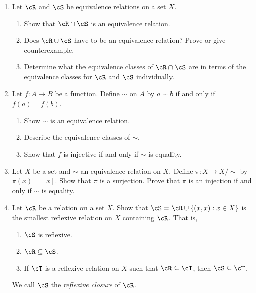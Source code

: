 \begin{enumerate}
  \item Let $\cR$ and $\cS$ be equivalence relations on a set $X$. 
\begin{enumerate}
    \item Show that $\cR \cap \cS$ is an equivalence relation.
    \item Does $\cR \cup \cS$ have to be an equivalence relation? Prove or give counterexample.
    \item Determine what the equivalence classes of $\cR \cap \cS$ are in terms of the equivalence classes for $\cR$ and $\cS$ individually.
\end{enumerate}

\item Let $f : A \to B$ be a function. Define $\sim$ on $A$ by $a \sim b$ if and only if $f(a) = f(b)$. 
\begin{enumerate}
    \item Show $\sim$ is an equivalence relation.
    \item Describe the equivalence classes of $\sim$.
    \item Show that $f$ is injective if and only if $\sim$ is equality.
\end{enumerate}

\item Let $X$ be a set and $\sim$ an equivalence relation on $X$. Define $\pi : X \to X/\sim$ by $\pi(x) = [x]$. Show that $\pi$ is a surjection. Prove that $\pi$ is an injection if and only if $\sim$ is equality.


\item Let $\cR$ be a relation on a set $X$. Show that $\cS = \cR \cup \{(x,x) : x \in X\}$ is the smallest reflexive relation on $X$ containing $\cR$. That is,
\begin{enumerate}
    \item $\cS$ is reflexive.
    \item $\cR \subseteq \cS$.
    \item If $\cT$ is a reflexive relation on $X$ such that $\cR \subseteq \cT$, then $\cS \subseteq \cT$.
\end{enumerate}
We call $\cS$ the \emph{reflexive closure} of $\cR$.


\end{enumerate}
